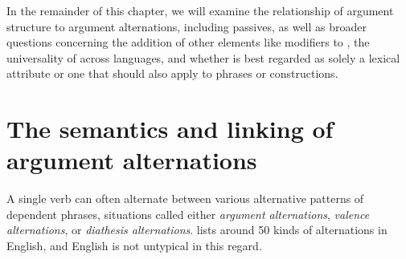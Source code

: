 \documentclass[output=paper
	        ,collection
	        ,collectionchapter
 	        ,biblatex
                ,babelshorthands
                ,newtxmath
                ,draftmode
                ,colorlinks, citecolor=brown
]{langscibook}
\begin{document}
In the remainder of this chapter, we will examine the relationship of argument structure to argument alternations, including passives, as well as broader questions concerning the addition of other elements like modifiers to \argst, the universality of \argst across languages, and whether \argst is best regarded as solely a lexical attribute or one that should also apply to phrases or constructions.


\section{The semantics and linking of argument alternations}
\label{alternations}
A single verb can often alternate between
 various alternative patterns of dependent phrases, situations called either 
\emph{argument alternations},
\emph{valence alternations}, or \emph{diathesis alternations}.
\citet{Levin1993} lists around 50 kinds of alternations in English, and English is not untypical in this regard.

%
\end{document}

